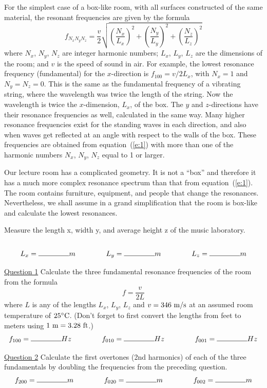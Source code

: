 \documentclass[11pt]{NSF}
\def\be{\begin{equation}}
\def\ee{\end{equation}}
\begin{document}
For the simplest case of a box-like room, with all surfaces constructed 
of the same material, the resonant frequencies are given by the formula
%
\be
f_{N_xN_yN_z} = \frac{v}{2}\sqrt{
\left(\frac{N_x}{L_x}\right)^2+
\left(\frac{N_y}{L_y}\right)^2+
\left(\frac{N_z}{L_z}\right)^2}
\label{e:1}
\ee
%
where $N_x$, $N_y$, $N_z$ are integer harmonic numbers; $L_x$, $L_y$,
$L_z$ are the dimensions of the room; and $v$ is the speed of sound in
air. For example, the lowest resonance frequency (fundamental) for the
$x$-direction is $f_{100} = v/2L_x$, with $N_x=1$ and $N_y=N_z=0$.
This is the same as the fundamental frequency of a vibrating
string, where the wavelength was twice the length of the string. Now
the wavelength is twice the $x$-dimension, $L_x$, of the box.  The $y$
and $z$-directions have their resonance frequencies as well,
calculated in the same way. Many higher resonance frequencies exist
for the standing waves in each direction, and also when waves get
reflected at an angle with respect to the walls of the box. These
frequencies are obtained from equation~(\ref{e:1}) with more than one of
the harmonic numbers $N_x$, $N_y$, $N_z$ equal to 1 or larger.

Our lecture room has a complicated geometry. It is not a ``box” 
and therefore it has a much more complex resonance spectrum than that from
equation~(\ref{e:1}). The room contains furniture, equipment, and people that
change the resonances. Nevertheless, we shall assume in a grand
simplification that the room is box-like and calculate the lowest
resonances.  

Measure the length x, width y, and average height z of the music laboratory. \\ \\
\[L_x = \rule{1.5cm}{0.15mm}m  \rule{1.5cm}{0.0mm}  L_y = \rule{1.5cm}{0.15mm}m \rule{1.5cm}{0.0mm}  L_z = \rule{1.5cm}{0.15mm}m\]

\underline{Question 1}  Calculate the three fundamental resonance frequencies of the room
from the formula
%
\be
f= \frac{v}{2L}
\ee
%
where $L$ is any of the lengths $L_x$, $L_y$, $L_z$ and $v = 346~{\rm
m/s}$ at an assumed room temperature of $25{}^\circ{\rm C}$.
(Don't forget to first convert the lengths from feet to meters using
$1~{\rm m}= 3.28~{\rm ft}$.)
\[f_{100} = \rule{1.5cm}{0.15mm}Hz  \rule{1.5cm}{0.0mm}  f_{010} = \rule{1.5cm}{0.15mm}Hz \rule{1.5cm}{0.0mm}  f_{001} = \rule{1.5cm}{0.15mm}Hz\]


\underline{Question 2}  Calculate the first overtones (2nd harmonics) of each of the three
fundamentals by doubling the frequencies from the preceding question.
\[f_{200} = \rule{1.5cm}{0.15mm}m  \rule{1.5cm}{0.0mm}  f_{020} = \rule{1.5cm}{0.15mm}m \rule{1.5cm}{0.0mm}  f_{002} = \rule{1.5cm}{0.15mm}m\]
\end{document}
